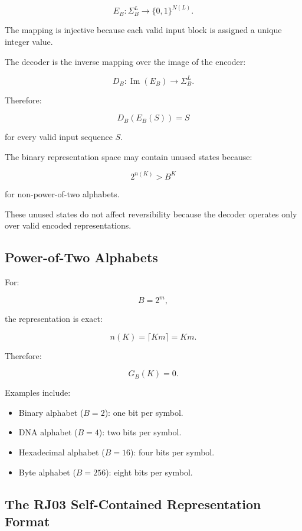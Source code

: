 \documentclass[onecolumn]{IEEEtran}
\begin{document}
\[
E_B:
\Sigma_B^L
\rightarrow
\{0,1\}^{N(L)} .
\]

The mapping is injective because each valid input block is assigned a
unique integer value.

The decoder is the inverse mapping over the image of the encoder:

\[
D_B:
\operatorname{Im}(E_B)
\rightarrow
\Sigma_B^L .
\]

Therefore:

\[
D_B(E_B(S))=S
\]

for every valid input sequence $S$.

The binary representation space may contain unused states because:

\[
2^{n(K)}>B^K
\]

for non-power-of-two alphabets.

These unused states do not affect reversibility because the decoder
operates only over valid encoded representations.

\subsection{Power-of-Two Alphabets}

For:

\[
B=2^m ,
\]

the representation is exact:

\[
n(K)
=
\lceil Km\rceil
=
Km .
\]

Therefore:

\[
G_B(K)=0 .
\]

Examples include:

\begin{itemize}

\item Binary alphabet ($B=2$): one bit per symbol.

\item DNA alphabet ($B=4$): two bits per symbol.

\item Hexadecimal alphabet ($B=16$): four bits per symbol.

\item Byte alphabet ($B=256$): eight bits per symbol.

\end{itemize}

\subsection{The RJ03 Self-Contained Representation Format}
\end{document}
